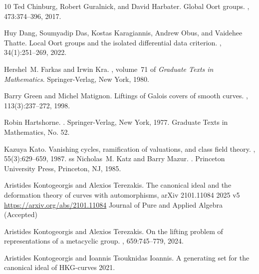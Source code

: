 \documentclass[11pt,letterpaper]{amsart}
\theoremstyle{definition}
\begin{document}
{\begin{thebibliography}{10}
Ted Chinburg, Robert Guralnick, and David Harbater.
\newblock Global {O}ort groups.
, 473:374--396, 2017.

Huy Dang, Soumyadip Das, Kostas Karagiannis, Andrew Obus, and Vaidehee Thatte.
\newblock Local {O}ort groups and the isolated differential data criterion.
, 34(1):251--269, 2022.

Hershel~M. Farkas and Irwin Kra.
, volume~71 of {\em Graduate Texts in
  Mathematics}.
\newblock Springer-Verlag, New York, 1980.

Barry Green and Michel Matignon.
\newblock Liftings of {G}alois covers of smooth curves.
, 113(3):237--272, 1998.

Robin Hartshorne.
.
\newblock Springer-Verlag, New York, 1977.
\newblock Graduate Texts in Mathematics, No. 52.

Kazuya Kato.
\newblock Vanishing cycles, ramification of valuations, and class field theory.
, 55(3):629--659, 1987.
ss
Nicholas~M. Katz and Barry Mazur.
.
\newblock Princeton University Press, Princeton, NJ, 1985.

Aristides Kontogeorgis and Alexios Terezakis.
\newblock The canonical ideal and the deformation theory of curves with
  automorphisms,
\newblock arXiv 2101.11084 2025 v5 \url{https://arxiv.org/abs/2101.11084}
\newblock Journal of Pure and Applied  Algebra (Accepted)



Aristides Kontogeorgis and Alexios Terezakis.
\newblock On the lifting problem of representations of a metacyclic group.
, 659:745--779, 2024.

Aristides Kontogeorgis and Ioannis Tsouknidas Ioannis.
\newblock A generating set for the canonical ideal of HKG-curves
 2021.


\end{thebibliography}}
\end{document}
